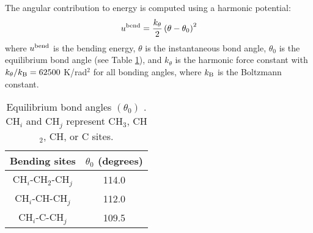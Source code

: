 \documentclass[preprint,review,12pt]{elsarticle}
\begin{document}
	The angular contribution to energy is computed using a harmonic potential:
	\begin{equation}
	u^{\rm bend} = \frac{k_\theta}{2} \left(\theta-\theta_0\right)^2
	\end{equation}
	where $u^{\rm bend}$ is the bending energy, $\theta$ is the instantaneous bond angle, $\theta_0$ is the equilibrium bond angle (see Table \ref{tab:angles}), and $k_\theta$ is the harmonic force constant with $k_\theta/k_{\rm B} = 62500$ K/rad$^2$ for all bonding angles, where $k_{\rm B}$ is the Boltzmann constant. 
	
	\begin{table}[h!]
		\caption{Equilibrium bond angles $(\theta_0)$ \cite{Martin1999,Potoff_branched}. CH$_i$ and CH$_j$ represent CH$_3$, CH$_2$, CH, or C sites.} \label{tab:angles}
		\begin{center}
			\begin{tabular}{|c|c|}
				\hline
				Bending sites & $\theta_0$ (degrees) \\ \hline
				CH$_i$-CH$_2$-CH$_j$ & 114.0 \\ 
				CH$_i$-CH-CH$_j$ & 112.0 \\ 
				CH$_i$-C-CH$_j$ & 109.5 \\  
				\hline
			\end{tabular}
		\end{center} 
	\end{table}
	
	
\end{document}
